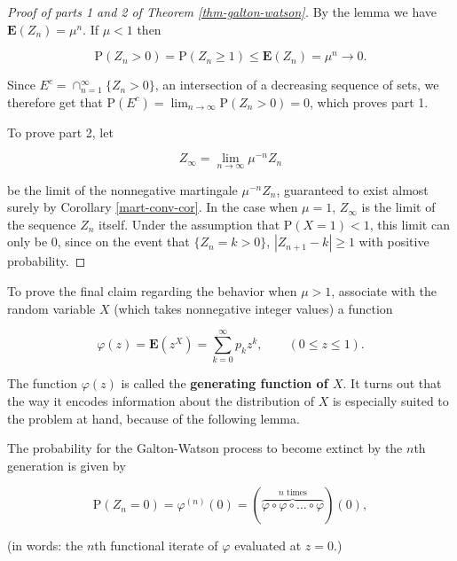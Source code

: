 \begin{proof}[Proof of parts 1 and 2 of Theorem \ref{thm-galton-watson}]
By the lemma we have $\mathbf{E}(Z_n)=\mu^n$. If
$\mu<1$ then

\[
\mathrm{P}(Z_n>0)=\mathrm{P}(Z_n\ge 1)\le \mathbf{E}(Z_n) = \mu^n \to 0.
\]

\noindent Since $E^c = \cap_{n=1}^\infty \{ Z_n>0 \}$, an
intersection of a decreasing sequence of sets, we
therefore get that
$\mathrm{P}(E^c)=\displaystyle\lim_{n\to\infty}
\mathrm{P}(Z_n>0)=0$,
which proves part 1.

To prove part 2, let

\[
Z_\infty = \lim_{n\to\infty} \mu^{-n} Z_n
\]

\noindent be the limit of the nonnegative martingale
$\mu^{-n} Z_n$, guaranteed to exist almost surely by
Corollary \ref{mart-conv-cor}. In the case when $\mu=1$,
$Z_\infty$ is the limit of the sequence $Z_n$ itself.
Under the assumption that $\mathrm{P}(X=1)<1$, this
limit can only be $0$, since on the event that
$\{Z_n=k>0\}$, $|Z_{n+1}-k|\ge 1$ with positive
probability.
\end{proof}

\noindent To prove the final claim regarding the behavior when
$\mu>1$, associate with the random variable $X$
(which takes nonnegative integer values) a function

\[
\varphi(z) = \mathbf{E}(z^X) = \sum_{k=0}^\infty p_k z^k, \qquad (0\le z\le 1).
\]

\noindent The function $\varphi(z)$ is called the \textbf{generating
function of $X$}. It turns out that the way it
encodes information about the distribution of $X$ is
especially suited to the problem at hand, because of
the following lemma.

\begin{lem}
The probability for the Galton-Watson process to
become extinct by the $n$th generation is given by

\[
\mathrm{P}(Z_n = 0) = \varphi^{(n)}(0) = (\overbrace{\varphi\circ \varphi\circ \ldots \circ \varphi}^{\textrm{$n$ times}})(0),
\]

\noindent (in words: the $n$th functional iterate of $\varphi$
evaluated at $z=0$.)
\end{lem}

